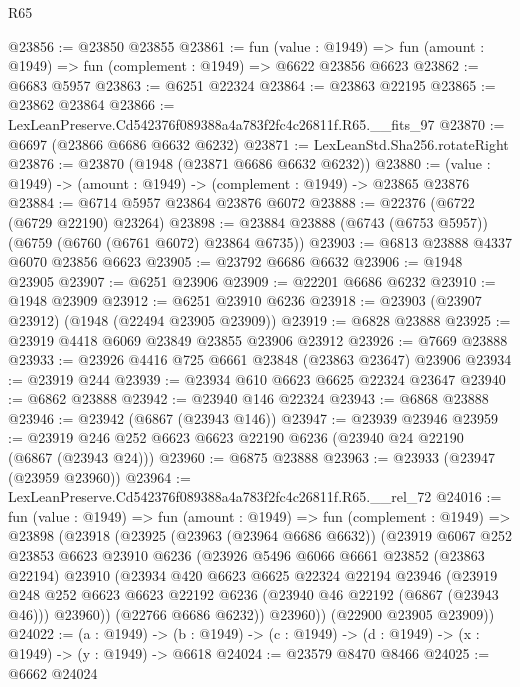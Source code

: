 \begin{lexlean}{R65}
\begin{coremodule}
{@23856 := @23850 @23855
@23861 := fun (value : @1949) =>
  fun (amount : @1949) => fun (complement : @1949) => @6622 @23856 @6623
@23862 := @6683 @5957
@23863 := @6251 @22324
@23864 := @23863 @22195
@23865 := @23862 @23864
@23866 := LexLeanPreserve.Cd542376f089388a4a783f2fc4c26811f.R65.__fits_97
@23870 := @6697 (@23866 @6686 @6632 @6232)
@23871 := LexLeanStd.Sha256.rotateRight
@23876 := @23870 (@1948 (@23871 @6686 @6632 @6232))
@23880 := (value : @1949) -> (amount : @1949) -> (complement : @1949) -> @23865 @23876
@23884 := @6714 @5957 @23864 @23876 @6072
@23888 := @22376 (@6722 (@6729 @22190) @23264)
@23898 := @23884 @23888 (@6743 (@6753 @5957)) (@6759 (@6760 (@6761 @6072) @23864 @6735))
@23903 := @6813 @23888 @4337 @6070 @23856 @6623
@23905 := @23792 @6686 @6632
@23906 := @1948 @23905
@23907 := @6251 @23906
@23909 := @22201 @6686 @6232
@23910 := @1948 @23909
@23912 := @6251 @23910 @6236
@23918 := @23903 (@23907 @23912) (@1948 (@22494 @23905 @23909))
@23919 := @6828 @23888
@23925 := @23919 @4418 @6069 @23849 @23855 @23906 @23912
@23926 := @7669 @23888
@23933 := @23926 @4416 @725 @6661 @23848 (@23863 @23647) @23906
@23934 := @23919 @244
@23939 := @23934 @610 @6623 @6625 @22324 @23647
@23940 := @6862 @23888
@23942 := @23940 @146 @22324
@23943 := @6868 @23888
@23946 := @23942 (@6867 (@23943 @146))
@23947 := @23939 @23946
@23959 := @23919 @246 @252 @6623 @6623 @22190 @6236 (@23940 @24 @22190 (@6867 (@23943 @24)))
@23960 := @6875 @23888
@23963 := @23933 (@23947 (@23959 @23960))
@23964 := LexLeanPreserve.Cd542376f089388a4a783f2fc4c26811f.R65.__rel_72
@24016 := fun (value : @1949) =>
  fun (amount : @1949) =>
  fun (complement : @1949) =>
  @23898
    (@23918
      (@23925
        (@23963 (@23964 @6686 @6632))
        (@23919
          @6067
          @252
          @23853
          @6623
          @23910
          @6236
          (@23926
            @5496
            @6066
            @6661
            @23852
            (@23863 @22194)
            @23910
            (@23934
              @420
              @6623
              @6625
              @22324
              @22194
              @23946
              (@23919
                @248
                @252
                @6623
                @6623
                @22192
                @6236
                (@23940 @46 @22192 (@6867 (@23943 @46)))
                @23960))
            (@22766 @6686 @6232))
          @23960))
      (@22900 @23905 @23909))
@24022 := (a : @1949) ->
  (b : @1949) -> (c : @1949) -> (d : @1949) -> (x : @1949) -> (y : @1949) -> @6618
@24024 := @23579 @8470 @8466
@24025 := @6662 @24024
}
\end{coremodule}
\end{lexlean}
